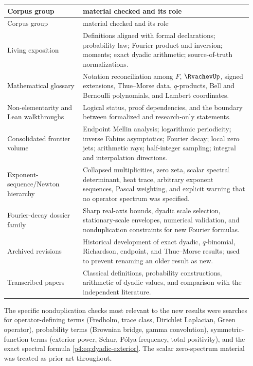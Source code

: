 \documentclass[11pt]{article}
\theoremstyle{definition}
\theoremstyle{remark}
\begin{document}
\begin{longtable}{>{\raggedright\arraybackslash}p{}
                  >{\raggedright\arraybackslash}p{}}
\toprule
Corpus group&material checked and its role\\
\midrule
\endfirsthead
\toprule
Corpus group&material checked and its role\\
\midrule
\endhead
\bottomrule
\endfoot
Living exposition&Definitions aligned with formal declarations; probability law;
Fourier product and inversion; moments; exact dyadic arithmetic; source-of-truth
normalizations.\\
Mathematical glossary&Notation reconciliation among \(F\), \(\RvachevUp\), signed extensions,
Thue--Morse data, \(q\)-products, Bell and Bernoulli polynomials, and Lambert
coordinates.\\
Non-elementarity and Lean walkthroughs&Logical status, proof dependencies, and the
boundary between formalized and research-only statements.\\
Consolidated frontier volume&Endpoint Mellin analysis; logarithmic periodicity;
inverse Fabius asymptotics; Fourier decay; local zero jets; arithmetic rays;
half-integer sampling; integral and interpolation directions.\\
Exponent-sequence/Newton hierarchy&Collapsed multiplicities, zero zeta, scalar
spectral determinant, heat trace, arbitrary exponent sequences, Pascal weighting, and
explicit warning that no operator spectrum was specified.\\
Fourier-decay dossier family&Sharp real-axis bounds, dyadic scale selection,
stationary-scale envelopes, numerical validation, and nonduplication constraints for
new Fourier formulas.\\
Archived revisions&Historical development of exact dyadic, \(q\)-binomial,
Richardson, endpoint, and Thue--Morse results; used to prevent renaming an older result
as new.\\
Transcribed papers&Classical definitions, probability constructions, arithmetic of
dyadic values, and comparison with the independent literature.\\
\end{longtable}

The specific nonduplication checks most relevant to the new results were searches for
operator-defining terms (Fredholm, trace class, Dirichlet Laplacian, Green operator),
probability terms (Brownian bridge, gamma convolution), symmetric-function terms
(exterior power, Schur, P\'olya frequency, total positivity), and the exact spectral
formula \eqref{p4:eq:dyadic-exterior}.  The scalar zero-spectrum material was treated as
prior art throughout.
\end{document}
